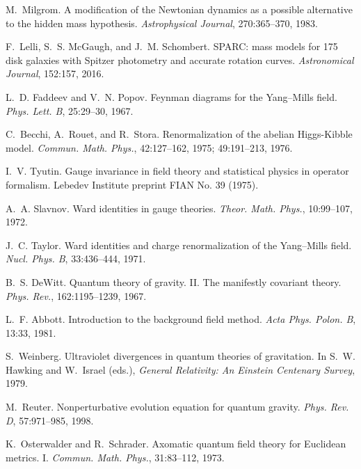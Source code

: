 \documentclass[11pt]{article}
\begin{document}
\begin{thebibliography}{99}
M.~Milgrom.
A modification of the Newtonian dynamics as a possible alternative to the hidden mass hypothesis.
\emph{Astrophysical Journal}, 270:365--370, 1983.

F.~Lelli, S.~S. McGaugh, and J.~M. Schombert.
SPARC: mass models for 175 disk galaxies with Spitzer photometry and accurate rotation curves.
\emph{Astronomical Journal}, 152:157, 2016.

L.~D. Faddeev and V.~N. Popov.
Feynman diagrams for the Yang--Mills field.
\emph{Phys. Lett. B}, 25:29--30, 1967.

C.~Becchi, A.~Rouet, and R.~Stora.
Renormalization of the abelian Higgs-Kibble model.
\emph{Commun. Math. Phys.}, 42:127--162, 1975; 49:191--213, 1976.

I.~V. Tyutin.
Gauge invariance in field theory and statistical physics in operator formalism.
Lebedev Institute preprint FIAN No. 39 (1975).

A.~A. Slavnov.
Ward identities in gauge theories.
\emph{Theor. Math. Phys.}, 10:99--107, 1972.

J.~C. Taylor.
Ward identities and charge renormalization of the Yang--Mills field.
\emph{Nucl. Phys. B}, 33:436--444, 1971.

B.~S. DeWitt.
Quantum theory of gravity. II. The manifestly covariant theory.
\emph{Phys. Rev.}, 162:1195--1239, 1967.

L.~F. Abbott.
Introduction to the background field method.
\emph{Acta Phys. Polon. B}, 13:33, 1981.

S.~Weinberg.
Ultraviolet divergences in quantum theories of gravitation.
In S.~W. Hawking and W.~Israel (eds.), \emph{General Relativity: An Einstein Centenary Survey}, 1979.

M.~Reuter.
Nonperturbative evolution equation for quantum gravity.
\emph{Phys. Rev. D}, 57:971--985, 1998.

K.~Osterwalder and R.~Schrader.
Axomatic quantum field theory for Euclidean metrics. I.
\emph{Commun. Math. Phys.}, 31:83--112, 1973.


\end{thebibliography}
\end{document}
